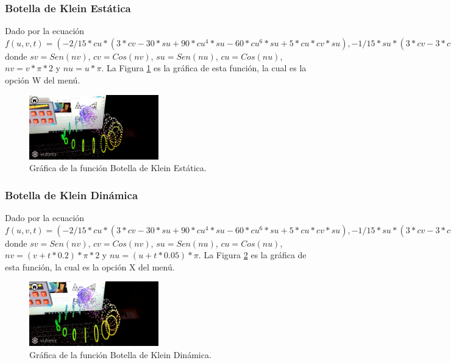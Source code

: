 \subsubsection{Botella de Klein Estática}
Dado por la ecuación $f(u,v,t)=(-2/15 * cu * (3 * cv - 30 * su + 90 * cu^4 * su - 60 * cu^6 * su + 5 * cu * cv * su), -1/15 * su * (3 * cv - 3 * cu^2 * cv - 48 * cu^4 * cv + 48 * cu^6 * cv - 60 * su + 5 * cu * cv * su - 5 * cu^3 * cv * su - 80 * cu^5 * cv * sv + 80 * cu^7 * cv * su) -2, 2/15 * (3 + 5 * cu * su) * sv)$ donde $sv = Sen(nv)$, $cv = Cos(nv)$, $su = Sen(nu)$, $cu = Cos(nu)$, $nv = v * \pi * 2$ y $nu = u * \pi$. La Figura \ref{fig:graf_klein_estatico} es la gráfica de esta función, la cual es la opción W del menú.

\begin{figure}[hbt!]
\centering
\includegraphics[width=0.5\textwidth]{figuras/graficas/klein_estatico.png}
\caption{\label{fig:graf_klein_estatico}Gráfica de la función Botella de Klein Estática.}
\end{figure}
\FloatBarrier

\subsubsection{Botella de Klein Dinámica}
Dado por la ecuación $f(u,v,t)=(-2/15 * cu * (3 * cv - 30 * su + 90 * cu^4 * su - 60 * cu^6 * su + 5 * cu * cv * su), -1/15 * su * (3 * cv - 3 * cu^2 * cv - 48 * cu^4 * cv + 48 * cu^6 * cv - 60 * su + 5 * cu * cv * su - 5 * cu^3 * cv * su - 80 * cu^5 * cv * sv + 80 * cu^7 * cv * su) -2, 2/15 * (3 + 5 * cu * su) * sv)$ donde $sv = Sen(nv)$, $cv = Cos(nv)$, $su = Sen(nu)$, $cu = Cos(nu)$, $nv = (v+ t * 0.2) * \pi * 2$ y $nu = (u+ t * 0.05) * \pi$. La Figura \ref{fig:graf_klein_dinamico} es la gráfica de esta función, la cual es la opción X del menú.

\begin{figure}[hbt!]
\centering
\includegraphics[width=0.5\textwidth]{figuras/graficas/klein_dinamico.png}
\caption{\label{fig:graf_klein_dinamico}Gráfica de la función Botella de Klein Dinámica.}
\end{figure}
\FloatBarrier



